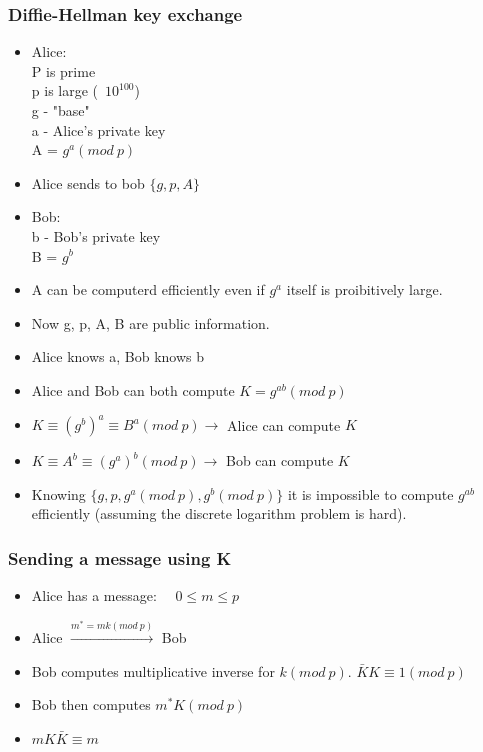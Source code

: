 \documentclass[9pt, letterpaper, oneside]{article}
\begin{document}
\subsubsection{Diffie-Hellman key exchange}
\begin{itemize}
\item Alice:\\
P is prime\\
p is large (~$10^{100}$)\\
g - "base"\\
a - Alice's private key\\
A = $g^a (mod \ p)$\\
\item Alice sends to bob $\{ g, p, A\}$
\item Bob:\\
b - Bob's private key\\
B = $g^b$
\item A can be computerd efficiently even if $g^a$ itself is proibitively large.
\item Now g, p, A, B are public information.
\item Alice knows a, Bob knows b
\item Alice and Bob can both compute $K = g^{ab} (mod \ p)$
\item $K \equiv (g^b)^a \equiv B^a (mod \ p) \to$ Alice can compute $K$
\item $K \equiv A^b \equiv (g^a)^b (mod \ p) \to$ Bob can compute $K$
\item Knowing $\{g, p, g^a (mod \ p), g^b (mod \ p)\}$ it is impossible to compute $g^{ab}$ efficiently (assuming the discrete logarithm problem is hard).
\end{itemize}

\subsubsection{Sending a message using K}
\begin{itemize}
\item Alice has a message: $\quad 0 \leq m \leq p$
\item Alice $\xrightarrow{m^* = mk(mod \ p)}$ Bob 
\item Bob computes multiplicative inverse for $k (mod \ p)$.
$\bar{K}K \equiv 1 (mod \ p)$
\item Bob then computes $m^*K (mod \ p)$
\item $mK\bar{K} \equiv m$
\end{itemize}
\end{document}

